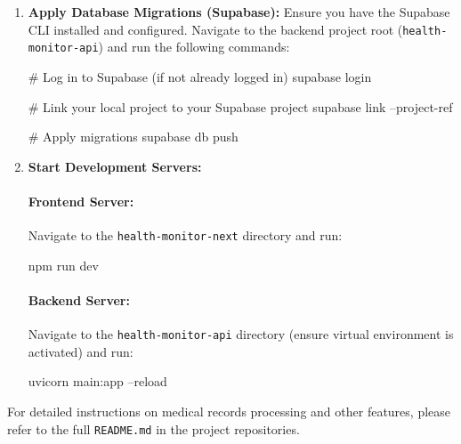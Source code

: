 \begin{enumerate}
    \item \textbf{Apply Database Migrations (Supabase):}
    Ensure you have the Supabase CLI installed and configured. Navigate to the backend project root (\texttt{health-monitor-api}) and run the following commands:
    \begin{tcolorbox}[listing engine=listings, colback=black!5!white, colframe=black!75!black, title=Supabase DB Migrations, listings options={breaklines=true, basicstyle=\ttfamily\footnotesize, columns=fixed, literate={<}{{\\textless}}1 {>}{{\\textgreater}}1, breakatwhitespace=true, keepspaces=true}]
# Log in to Supabase (if not already logged in)
supabase login

# Link your local project to your Supabase project
supabase link --project-ref 

# Apply migrations
supabase db push
    \end{tcolorbox}

    \item \textbf{Start Development Servers:}
    \paragraph*{Frontend Server:}
    Navigate to the \texttt{health-monitor-next} directory and run:
    \begin{tcolorbox}[listing engine=listings, colback=black!5!white, colframe=black!75!black, title=Start Frontend Server, listings options={breaklines=true, basicstyle=\ttfamily\footnotesize, breakatwhitespace=true, keepspaces=true}]
npm run dev
    \end{tcolorbox}
    \paragraph*{Backend Server:}
    Navigate to the \texttt{health-monitor-api} directory (ensure virtual environment is activated) and run:
    \begin{tcolorbox}[listing engine=listings, colback=black!5!white, colframe=black!75!black, title=Start Backend Server, listings options={breaklines=true, basicstyle=\ttfamily\footnotesize, breakatwhitespace=true, keepspaces=true}]
uvicorn main:app --reload
    \end{tcolorbox}
\end{enumerate}

For detailed instructions on medical records processing and other features, please refer to the full \texttt{README.md} in the project repositories.
